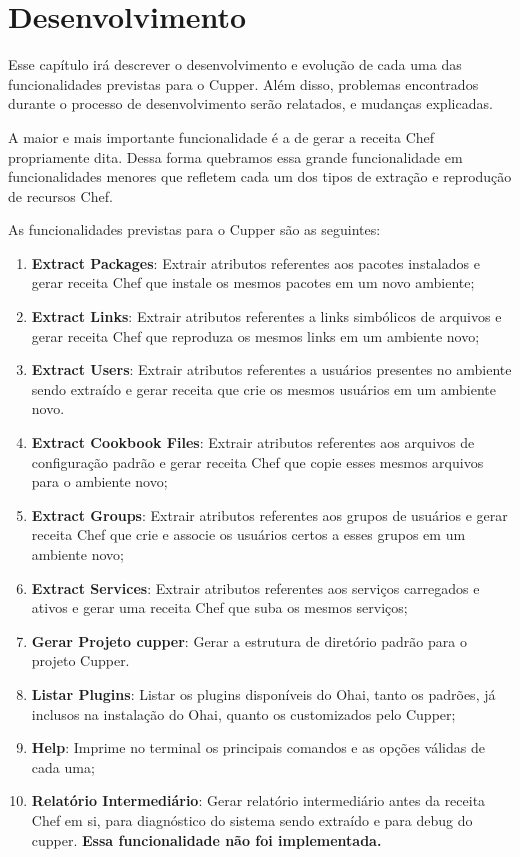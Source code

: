 \newpage\null\thispagestyle{empty}\newpage
\chapter{Desenvolvimento}
\label{chap:dev}

Esse capítulo irá descrever o desenvolvimento e evolução de cada uma das funcionalidades
previstas para o Cupper. Além disso, problemas encontrados durante o processo
de desenvolvimento serão relatados, e mudanças explicadas.

A maior e mais importante funcionalidade é a de gerar a receita Chef propriamente dita.
Dessa forma quebramos essa grande funcionalidade em funcionalidades menores que refletem cada
um dos tipos de extração e reprodução de recursos Chef.

As funcionalidades previstas para o Cupper são as seguintes:

\begin{enumerate}
  \item \textbf{Extract Packages}: Extrair atributos referentes aos pacotes
instalados e gerar receita Chef que instale os mesmos pacotes em um novo ambiente;
  \item \textbf{Extract Links}: Extrair atributos referentes a links simbólicos
de arquivos e gerar receita Chef que reproduza os mesmos links em um ambiente novo;
  \item \textbf{Extract Users}: Extrair atributos referentes a usuários presentes
no ambiente sendo extraído e gerar receita que crie os mesmos usuários em um
ambiente novo.
  \item \textbf{Extract Cookbook Files}: Extrair atributos referentes aos arquivos
de configuração padrão e gerar receita Chef que copie esses mesmos arquivos para o ambiente novo;
  \item \textbf{Extract Groups}: Extrair atributos referentes aos grupos de usuários
e gerar receita Chef que crie e associe os usuários certos a esses grupos em um
ambiente novo;
  \item \textbf{Extract Services}: Extrair atributos referentes aos serviços carregados
e ativos e gerar uma receita Chef que suba os mesmos serviços;
  \item \textbf{Gerar Projeto cupper}: Gerar a estrutura de diretório padrão 
para o projeto Cupper.
  \item \textbf{Listar Plugins}: Listar os plugins disponíveis do Ohai, tanto 
os padrões, já inclusos na instalação do Ohai, quanto os customizados pelo Cupper;
  \item \textbf{Help}: Imprime no terminal os principais comandos e as opções
válidas de cada uma;
  \item \textbf{Relatório Intermediário}: Gerar relatório intermediário antes
da receita Chef em si, para diagnóstico do sistema sendo extraído e para debug
do cupper. \textbf{Essa funcionalidade não foi implementada.}

\end{enumerate}

